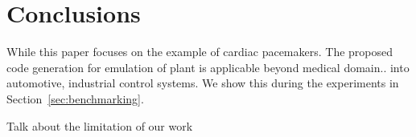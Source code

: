 \section{Conclusions}

While this paper focuses on the example of cardiac pacemakers.
The proposed code generation for emulation of plant is applicable 
beyond medical domain.. into automotive, industrial control systems.
We show this during the experiments in Section~\ref{sec:benchmarking}.

Talk about the limitation of our work
